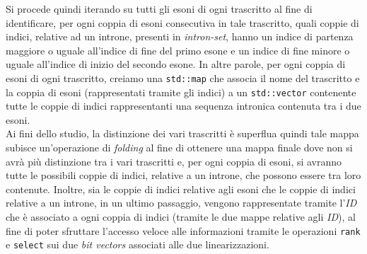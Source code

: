 \documentclass[a4paper,12pt, oneside]{book}
\begin{document}
Si procede quindi iterando su tutti gli esoni di ogni trascritto al fine di
identificare, per ogni coppia di esoni consecutiva in tale trascritto, quali
coppie di indici, relative ad un introne, presenti in \textit{intron-set},
hanno un indice di partenza maggiore o uguale all'indice di fine del primo
esone e un indice di fine minore o uguale all'indice di inizio del secondo
esone. In altre parole, per 
ogni coppia di esoni di ogni trascritto, creiamo una \texttt{std::map} che
associa il nome del trascritto e la coppia di esoni (rappresentati tramite gli
indici) a un \texttt{std::vector} contenente tutte le coppie di indici
rappresentanti una sequenza intronica contenuta tra i due esoni.\\
Ai fini dello studio, la distinzione dei vari trascritti è superflua quindi
tale mappa subisce un'operazione di \textit{folding} al fine di ottenere una
mappa finale dove non si avrà più distinzione tra i vari trascritti e, per ogni
coppia di esoni, si avranno tutte le possibili coppie di indici, relative a un
introne, che possono essere tra loro contenute. Inoltre, sia le coppie di indici
relative agli esoni
che le coppie di indici relative a un introne, in un ultimo
passaggio, vengono rappresentate tramite l'\textit{ID} che 
è associato a ogni coppia di indici (tramite le due mappe relative agli
\textit{ID}), al fine di poter sfruttare l'accesso veloce  
alle informazioni tramite le operazioni \texttt{rank} e \texttt{select} sui due
\textit{bit vectors} associati alle due linearizzazioni.
\end{document}
